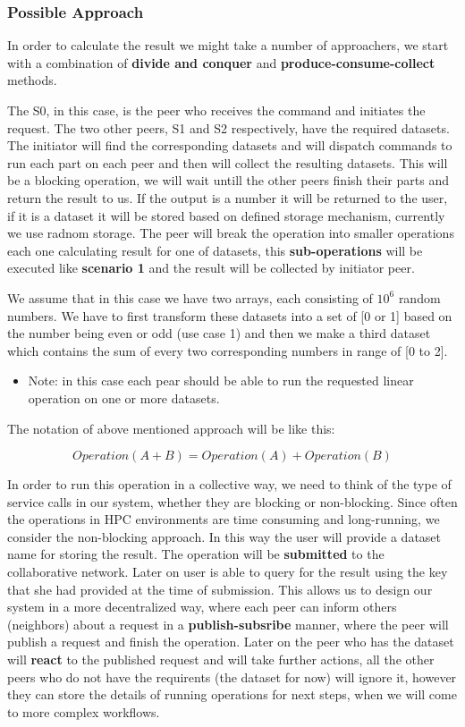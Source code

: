 \subsubsection{Possible Approach}
In order to calculate the result we might take a number of approachers, we start with a combination of \textbf{divide and conquer} and
\textbf{produce-consume-collect} methods.

The S0, in this case, is the peer who receives the command and initiates the request. The two other peers, S1 and S2 respectively, have the required
datasets. The initiator will find the corresponding datasets and will dispatch commands to run each part on each peer and then will collect
the resulting datasets. This will be a blocking operation, we will wait untill the other peers finish their parts and return the result
to us. If the output is a number it will be returned to the user, if it is a dataset it will be stored based on defined storage mechanism, 
currently we use radnom storage. The peer will break the operation into smaller operations each one calculating result for one of datasets, 
this \textbf{sub-operations} will be executed like \textbf{scenario 1} and the result will be collected by initiator peer.

We assume that in this case we have two arrays, each consisting of \(10^6\) random numbers. We have to first transform these datasets into
a set of [0 or 1] based on the number being even or odd (use case 1) and then we make a third dataset which contains the sum of every two
corresponding numbers in range of [0 to 2].


\begin{itemize}
\item Note: in this case each pear should be able to run the requested linear operation on one or more datasets.
\end{itemize}

The notation of above mentioned approach will be like this:

\[ Operation(A + B) = Operation(A) + Operation(B) \]

In order to run this operation in a collective way, we need to think of the type of service calls in our system, whether they are blocking or
non-blocking. Since often the operations in HPC environments are time consuming and long-running, we consider the non-blocking approach. In
this way the user will provide a dataset name for storing the result. The operation will be \textbf{submitted} to the collaborative network.
Later on user is able to query for the result using the key that she had provided at the time of submission. This allows us to design our system
in a more decentralized way, where each peer can inform others (neighbors) about a request in a \textbf{publish-subsribe} manner, where the peer
will publish a request and finish the operation. Later on the peer who has the dataset will \textbf{react} to the published request and will take
further actions, all the other peers who do not have the requirents (the dataset for now) will ignore it, however they can store the details of 
running operations for next steps, when we will come to more complex workflows.

